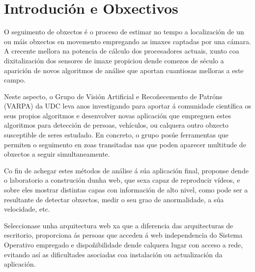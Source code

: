 \chapter{Introdución e Obxectivos}

O seguimento de obxectos é o proceso de estimar no tempo a localización de un ou máis 
obxectos en movemento empregando as imaxes captadas por una cámara. A crecente mellora 
na potencia de cálculo dos procesadores actuais, xunto coa dixitalización dos sensores 
de imaxe propiciou dende comezos de século a aparición de novos algoritmos de análise 
que aportan cuantiosas melloras a este campo.

Neste aspecto, o Grupo de Visión Artificial e Recoñecemento de Patróns (VARPA)
da UDC leva anos investigando para aportar á comunidade científica os seus propios algoritmos
e desenvolver novas aplicación que empreguen estes algoritmos para detección de persoas,
vehículos, ou calquera outro obxecto susceptible de seres estudado. En concreto, o
grupo posúe ferramentas que permiten o seguimento en zoas transitadas nas que poden 
aparecer multitude de obxectos a seguir simultaneamente. 

Co fin de achegar estes métodos de análise á súa aplicación final, proponse dende o 
laboratorio a construción dunha web, que sexa capaz de reproducir vídeos, e sobre eles
mostrar distintas capas con información de alto nivel, como pode ser a resultante de
detectar obxectos, medir o seu grao de anormalidade, a súa velocidade, etc. 

Seleccionase unha arquitectura web xa que a diferencia das arquitecturas de escritorio,
proporciona ás persoas que acceden á web independencia do Sistema Operativo empregado e
dispoñibilidade dende calquera lugar con acceso a rede, evitando así as dificultades 
asociadas coa instalación ou actualización da aplicación. 
